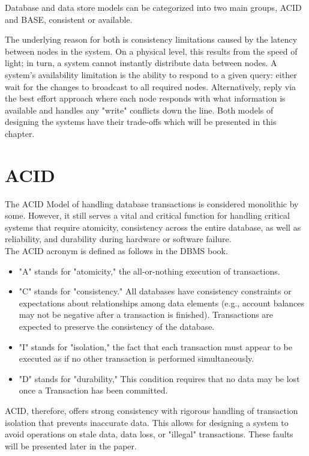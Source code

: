 \documentclass[a4paper,10pt,titlepage]{report}
\begin{document}
    Database and data store models can be categorized into two main groups, ACID and BASE, consistent or available.

    The underlying reason for both is consistency limitations caused by the latency between nodes in the system. On a physical level, this results from the speed of light; in turn, a system cannot instantly distribute data between nodes. A system's availability limitation is the ability to respond to a given query: either wait for the changes to broadcast to all required nodes. Alternatively, reply via the best effort approach where each node responds with what information is available and handles any "write" conflicts down the line. Both models of designing the systems have their trade-offs which will be presented in this chapter.


    \section{ACID}
    The ACID Model of handling database transactions is considered monolithic by some. However, it still serves a vital and critical function for handling critical systems that require atomicity, consistency across the entire database, as well as reliability, and durability during hardware or software failure.\\
    \vspace{5mm}
    The ACID acronym is defined as follows in the DBMS book\cite{DBMSbook}.

    \begin{itemize}
        \item "A" stands for "atomicity," the all-or-nothing execution of transactions.
        \item "C" stands for "consistency." All databases have consistency constraints or expectations about relationships among data elements (e.g., account balances may not be negative after a transaction is finished). Transactions are expected to preserve the consistency of the database.
        \item "I" stands for "isolation," the fact that each transaction must appear to be executed as if no other transaction is performed simultaneously.
        \item "D" stands for "durability," This condition requires that no data may be lost once a Transaction has been committed.
    \end{itemize}

    ACID, therefore, offers strong consistency with rigorous handling of transaction isolation that prevents inaccurate data. This allows for designing a system to avoid operations on stale data, data loss, or "illegal" transactions. These faults will be presented later in the paper.
\end{document}
